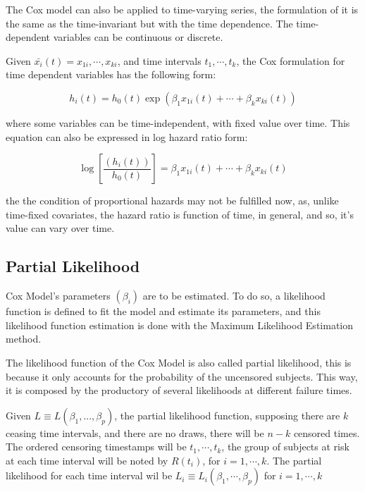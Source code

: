 \documentclass[11pt]{book} %
\begin{document}
      The Cox model can also be applied to time-varying series, the formulation of it is the same as the time-invariant but with the time dependence. The time-dependent variables can be continuous or discrete.

      Given $\bar{x_i}(t) = x_{1i},\cdots,x_{ki}$, and time intervals $t_1,\cdots,t_k$, the Cox formulation for time dependent variables has the following form:

      \begin{equation}
        h_i(t) = h_0(t)\exp(\beta_1x_{1i}(t)+\cdots+\beta_kx_{ki}(t))
        \label{eq:cox-time-varying-hazard}
      \end{equation}

      where some variables can be time-independent, with fixed value over time. This equation can also be expressed in log hazard ratio form:

      \begin{equation}
        \log \left[ \frac{(h_i(t))}{h_0(t)} \right] = \beta_1x_{1i}(t) + \cdots + \beta_kx_{ki}(t)
        \label{eq:cox-time-varying-hazard-ratio}
      \end{equation}

      the the condition of proportional hazards may not be fulfilled now, as, unlike time-fixed covariates, the hazard ratio is function of time, in general, and so, it's value can vary over time.

    \subsection{Partial Likelihood}

      Cox Model's parameters $(\beta_i)$ are to be estimated. To do so, a likelihood function is defined to fit the model and estimate its parameters, and this likelihood function estimation is done with the Maximum Likelihood Estimation method.

      The likelihood function of the Cox Model is also called partial likelihood, this is because it only accounts for the probability of the uncensored subjects. This way, it is composed by the productory of several likelihoods at different failure times.

      Given $L\equiv L(\beta_1,...,\beta_p)$, the partial likelihood function, supposing there are $k$ ceasing time intervals, and there are no draws, there will be $n - k$ censored times. The ordered censoring timestamps will be $t_1, \cdots,t_k$, the group of subjects at risk at each time interval will be noted by $R(t_i)$, for $i=1,\cdots,k$. The partial likelihood for each time interval wil be $L_i\equiv L_i(\beta_1,\cdots,\beta_p)$ for $i=1,\cdots,k$
\end{document}
